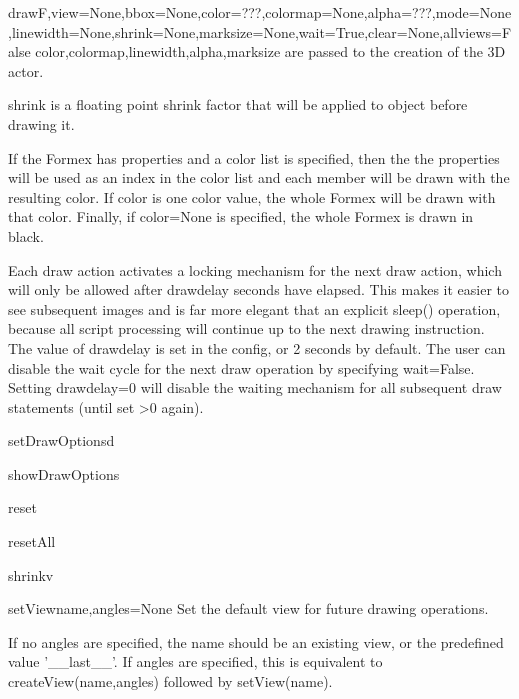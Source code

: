 \begin{funcdesc}{draw}{F,view=None,bbox=None,color=???,colormap=None,alpha=???,mode=None,linewidth=None,shrink=None,marksize=None,wait=True,clear=None,allviews=False}
    color,colormap,linewidth,alpha,marksize are passed to the
    creation of the 3D actor.

    shrink is a floating point shrink factor that will be applied to object
    before drawing it.

    If the Formex has properties and a color list is specified, then the
    the properties will be used as an index in the color list and each member
    will be drawn with the resulting color.
    If color is one color value, the whole Formex will be drawn with
    that color.
    Finally, if color=None is specified, the whole Formex is drawn in black.
    
    Each draw action activates a locking mechanism for the next draw action,
    which will only be allowed after drawdelay seconds have elapsed. This
    makes it easier to see subsequent images and is far more elegant that an
    explicit sleep() operation, because all script processing will continue
    up to the next drawing instruction.
    The value of drawdelay is set in the config, or 2 seconds by default.
    The user can disable the wait cycle for the next draw operation by
    specifying wait=False. Setting drawdelay=0 will disable the waiting
    mechanism for all subsequent draw statements (until set >0 again).
    

\end{funcdesc}


\begin{funcdesc}{setDrawOptions}{d}


\end{funcdesc}


\begin{funcdesc}{showDrawOptions}{}


\end{funcdesc}


\begin{funcdesc}{reset}{}


\end{funcdesc}


\begin{funcdesc}{resetAll}{}


\end{funcdesc}


\begin{funcdesc}{shrink}{v}


\end{funcdesc}


\begin{funcdesc}{setView}{name,angles=None}
Set the default view for future drawing operations.

    If no angles are specified, the name should be an existing view, or
    the predefined value '__last__'.
    If angles are specified, this is equivalent to createView(name,angles)
    followed by setView(name).
    

\end{funcdesc}


